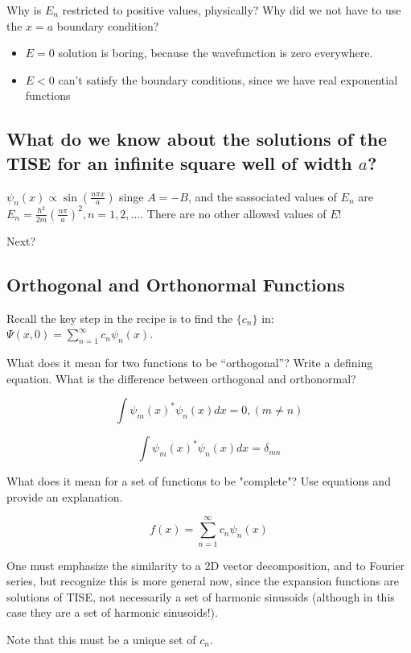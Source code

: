 \documentclass{article}
\begin{document}
Why is $E_n$ restricted to positive values, physically? Why did we not have to use the $x = a$ boundary condition?

\begin{itemize}
    \item $E=0$ solution is boring, because the wavefunction is zero everywhere. 
    \item $E < 0$ can't satisfy the boundary conditions, since we have real exponential functions
\end{itemize}

\subsection*{What do we know about the solutions of the TISE for an infinite square well of width $a$?}

$\psi_n(x) \propto \sin \left( \frac{n \pi x}{a} \right)$ singe $A = -B$, and the sassociated values of $E_n$ are $E_n = \frac{\hbar^2}{2m} \left( \frac{n \pi}{a} \right)^2, n = 1,2,...$. There are no other allowed values of $E$!

Next?

\subsection{Orthogonal and Orthonormal Functions}

Recall the key step in the recipe is to find the $\{c_n\}$ in: $\Psi(x,0) = \sum_{n=1}^\infty c_n \psi_n(x)$.

What does it mean for two functions to be “orthogonal”? Write a defining equation.  What is the difference between orthogonal and orthonormal? 

$$\int \psi_m(x)^* \psi_n(x) dx = 0, (m \neq n)$$

$$\int \psi_m(x)^* \psi_n(x) dx = \delta_{mn}$$

What does it mean for a set of functions to be "complete"? Use equations and provide an explanation. 

$$f(x) = \sum_{n=1}^\infty c_n \psi_n(x)$$

One must emphasize the similarity to a 2D vector decomposition, and to Fourier series, but recognize this is more general now, since the expansion functions are solutions of TISE, not necessarily a set of harmonic sinusoids (although in this case they are a set of harmonic sinusoids!). 

Note that this must be a unique set of $c_n$. 
\end{document}
